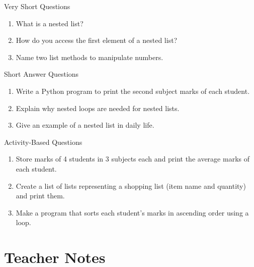 \begin{exercise}{Very Short Questions}
\begin{enumerate}
    \item What is a nested list?  
    \item How do you access the first element of a nested list?  
    \item Name two list methods to manipulate numbers.  
\end{enumerate}
\end{exercise}

\begin{exercise}{Short Answer Questions}
\begin{enumerate}
    \item Write a Python program to print the second subject marks of each student.  
    \item Explain why nested loops are needed for nested lists.  
    \item Give an example of a nested list in daily life.  
\end{enumerate}
\end{exercise}

\begin{exercise}{Activity-Based Questions}
\begin{enumerate}
    \item Store marks of 4 students in 3 subjects each and print the average marks of each student.  
    \item Create a list of lists representing a shopping list (item name and quantity) and print them.  
    \item Make a program that sorts each student’s marks in ascending order using a loop.  
\end{enumerate}
\end{exercise}

\section{Teacher Notes}

